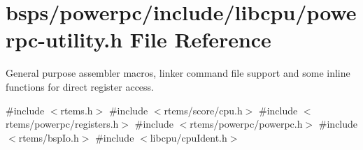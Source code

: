\hypertarget{powerpc-utility_8h}{}\section{bsps/powerpc/include/libcpu/powerpc-\/utility.h File Reference}
\label{powerpc-utility_8h}


General purpose assembler macros, linker command file support and some inline functions for direct register access.  


{\ttfamily \#include $<$rtems.\+h$>$}\newline
{\ttfamily \#include $<$rtems/score/cpu.\+h$>$}\newline
{\ttfamily \#include $<$rtems/powerpc/registers.\+h$>$}\newline
{\ttfamily \#include $<$rtems/powerpc/powerpc.\+h$>$}\newline
{\ttfamily \#include $<$rtems/bsp\+Io.\+h$>$}\newline
{\ttfamily \#include $<$libcpu/cpu\+Ident.\+h$>$}\newline
